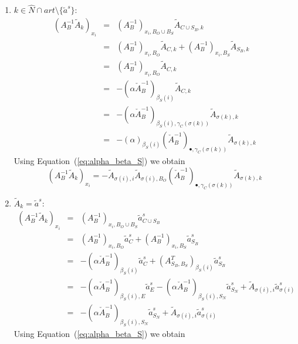\documentclass[a4paper]{article}
\begin{document}
\begin{enumerate}
\item $k \in \hat{N} \cap art \setminus \{\tilde{a}^{s}\}$:
\begin{eqnarray}
  (A_{B}^{-1}\tilde{A}_{k})_{x_{i}} &=& 
  (A_{B}^{-1})_{x_{i}, B_{O} \cup B_{S}}\tilde{A}_{C \cup S_{B}, k}
  \nonumber \\
  &=&
  (A_{B}^{-1})_{x_{i}, B_{O}}\tilde{A}_{C, k} +
  (A_{B}^{-1})_{x_{i}, B_{S}}\tilde{A}_{S_{B}, k} 
  \nonumber \\
  &=&
  (A_{B}^{-1})_{x_{i}, B_{O}}\tilde{A}_{C, k}
  \nonumber \\ 
  &=&
  -\left(\alpha\check{A}_{B}^{-1}\right)_{\beta_{S}(i)}\tilde{A}_{C, k}
  \nonumber \\
  &=&
  -\left(\alpha\check{A}_{B}^{-1}\right)_{\beta_{S}(i), \gamma_{C}(\sigma(k))}
  \tilde{A}_{\sigma(k), k}
  \nonumber \\
  &=&
  -\left(\alpha\right)_{\beta_{S}(i)}
  \left(\check{A}_{B}^{-1}\right)_{\bullet, \gamma_{C}(\sigma(k))}
  \tilde{A}_{\sigma(k), k}
  \nonumber
\end{eqnarray}
Using Equation~(\ref{eq:alpha_beta_S}) we obtain
\begin{equation}
(A_{B}^{-1}\tilde{A}_{k})_{x_{i}} =
  -\tilde{A}_{\sigma(i), i}\tilde{A}_{\sigma(i), B_{O}}
  \left(\check{A}_{B}^{-1}\right)_{\bullet, \gamma_{C}(\sigma(k))}
  \tilde{A}_{\sigma(k), k}
\end{equation}
\item $\tilde{A}_{k}=\tilde{a}^{s}$:
\begin{eqnarray}
  (A_{B}^{-1}\tilde{A}_{k})_{x_{i}} &=& 
  (A_{B}^{-1})_{x_{i}, B_{O} \cup B_{S}}\tilde{a}_{C \cup S_{B}}^{s}
  \nonumber \\
  &=&
  (A_{B}^{-1})_{x_{i}, B_{O}}\tilde{a}_{C}^{s} +
  (A_{B}^{-1})_{x_{i}, B_{S}}\tilde{a}_{S_{B}}^{s}
  \nonumber \\
  &=&
  -(\alpha\check{A}_{B}^{-1})_{\beta_{S}(i)}\tilde{a}_{C}^{s} +
  (A_{S_{B}, B_{S}}^{T})_{\beta_{S}(i)}\tilde{a}_{S_{B}}^{s}
  \nonumber \\ 
  &=&
  -(\alpha\check{A}_{B}^{-1})_{\beta_{S}(i), E}\tilde{a}_{E}^{s}
  -(\alpha\check{A}_{B}^{-1})_{\beta_{S}(i), S_{N}}\tilde{a}_{S_{N}}^{s}
  + \tilde{A}_{\sigma(i), i}\tilde{a}_{\sigma(i)}^{s}
  \nonumber \\
  &=&
  -(\alpha\check{A}_{B}^{-1})_{\beta_{S}(i), S_{N}}\tilde{a}_{S_{N}}^{s}
  + \tilde{A}_{\sigma(i), i}\tilde{a}_{\sigma(i)}^{s}
  \nonumber  
\end{eqnarray}
Using Equation~(\ref{eq:alpha_beta_S}) we obtain
\begin{equation}

\end{equation}
\end{enumerate}
\end{document}
